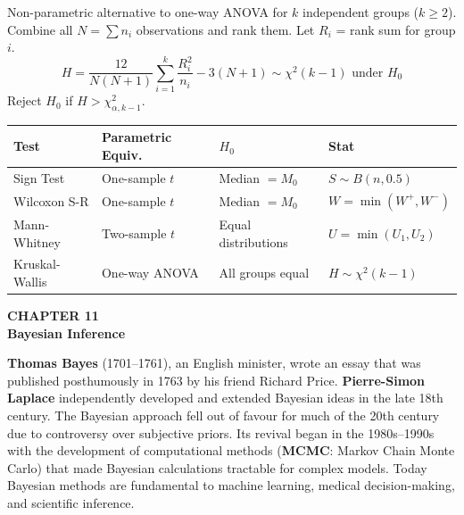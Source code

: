 \documentclass[12pt]{article}
\newcommand{\hcell}[1]{\textbf{\color{white}#1}}
\begin{document}
\begin{defbox}
Non-parametric alternative to one-way ANOVA for $k$ independent groups ($k\geq2$).\\[4pt]
Combine all $N=\sum n_i$ observations and rank them. Let $R_i$ = rank sum for group $i$.
\[H=\frac{12}{N(N+1)}\sum_{i=1}^k\frac{R_i^2}{n_i}-3(N+1)\sim\chi^2(k-1)\text{ under }H_0\]
Reject $H_0$ if $H>\chi^2_{\alpha,k-1}$.
\end{defbox}

\begin{center}{\small
\begin{tabular}{|l|C{3cm}|C{3.5cm}|C{2.5cm}|}
\hline{}\hcell{Test}&\hcell{Parametric Equiv.}&\hcell{$H_0$}&\hcell{Stat}\\\hline
Sign Test & One-sample $t$ & Median $=M_0$ & $S\sim B(n,0.5)$\\\hline
Wilcoxon S-R & One-sample $t$ & Median $=M_0$ & $W=\min(W^+,W^-)$\\\hline
Mann-Whitney & Two-sample $t$ & Equal distributions & $U=\min(U_1,U_2)$\\\hline
Kruskal-Wallis & One-way ANOVA & All groups equal & $H\sim\chi^2(k-1)$\\\hline
\end{tabular}}
\end{center}

\newpage

\begin{tcolorbox}[enhanced,arc=0pt,boxrule=0pt,colback=primary,colframe=primary,
  left=16pt,right=16pt,top=14pt,bottom=10pt,borderline south={4pt}{0pt}{accent}]
  {\color{accent!70}\small\bfseries CHAPTER 11}\\[4pt]
  {\LARGE\bfseries\color{white}Bayesian Inference}
\end{tcolorbox}
\vspace{10pt}

\begin{histbox}
\textbf{Thomas Bayes} (1701--1761), an English minister, wrote an essay that was published posthumously in 1763 by his friend Richard Price. \textbf{Pierre-Simon Laplace} independently developed and extended Bayesian ideas in the late 18th century. The Bayesian approach fell out of favour for much of the 20th century due to controversy over subjective priors. Its revival began in the 1980s--1990s with the development of computational methods (\textbf{MCMC}: Markov Chain Monte Carlo) that made Bayesian calculations tractable for complex models. Today Bayesian methods are fundamental to machine learning, medical decision-making, and scientific inference.
\end{histbox}
\end{document}
